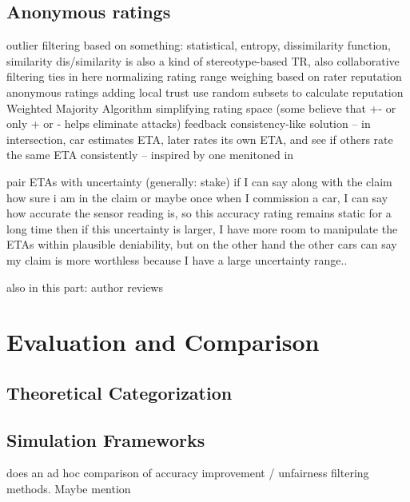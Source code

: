 \documentclass[%
    ]{\PathToTumTemplate/thesis/tum_thesis}
\begin{document}
\subsection{Anonymous ratings}


outlier filtering based on something: statistical, entropy, dissimilarity function, similarity
dis/similarity is also a kind of stereotype-based TR, also collaborative filtering ties in here
normalizing rating range
weighing based on rater reputation
anonymous ratings
adding local trust
use random subsets to calculate reputation
Weighted Majority Algorithm 
simplifying rating space (some believe that +- or only + or - helps eliminate attacks)
feedback consistency-like solution -- in intersection, car estimates ETA, later rates its own ETA, and see if others rate the same ETA consistently -- inspired by one menitoned in \cite{azzedin_identifying_2010}

pair ETAs with uncertainty (generally: stake)
if I can say along with the claim how sure i am in the claim
or maybe once when I commission a car, I can say how accurate the sensor reading is, so this accuracy rating remains static for a long time
then if this uncertainty is larger, I have more room to manipulate the ETAs within plausible deniability, but on the other hand the other cars can say my claim is more worthless because I have a large uncertainty range..


also in this part: author reviews



\section{Evaluation and Comparison}\label{sec:evaluation_systems}

\subsection{Theoretical Categorization}

\subsection{Simulation Frameworks}


\cite{zhang_detailed_2008} does an ad hoc comparison of accuracy improvement / unfairness filtering methods. Maybe mention
\end{document}
